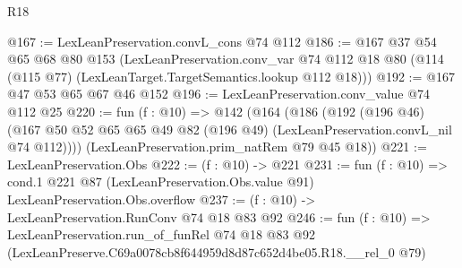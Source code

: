 \begin{lexlean}{R18}
\begin{coremodule}
@167 := LexLeanPreservation.convL_cons @74 @112
@186 := @167
    @37
    @54
    @65
    @68
    @80
    @153
    (LexLeanPreservation.conv_var
      @74
      @112
      @18
      @80
      (@114 (@115 @77) (LexLeanTarget.TargetSemantics.lookup @112 @18)))
@192 := @167 @47 @53 @65 @67 @46 @152
@196 := LexLeanPreservation.conv_value @74 @112 @25
@220 := fun (f : @10) =>
  @142
    (@164
      (@186
        (@192
          (@196 @46)
          (@167 @50 @52 @65 @65 @49 @82 (@196 @49) (LexLeanPreservation.convL_nil @74 @112))))
      (LexLeanPreservation.prim_natRem @79 @45 @18))
@221 := LexLeanPreservation.Obs
@222 := (f : @10) -> @221
@231 := fun (f : @10) =>
  cond.{1} @221 @87 (LexLeanPreservation.Obs.value @91) LexLeanPreservation.Obs.overflow
@237 := (f : @10) -> LexLeanPreservation.RunConv @74 @18 @83 @92
@246 := fun (f : @10) =>
  LexLeanPreservation.run_of_funRel
    @74
    @18
    @83
    @92
    (LexLeanPreserve.C69a0078cb8f644959d8d87c652d4be05.R18.__rel_0 @79)
\end{coremodule}
\end{lexlean}

